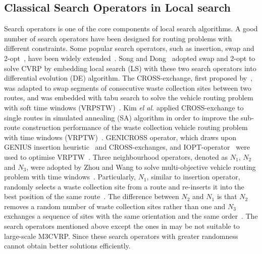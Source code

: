 \documentclass[journal]{IEEEtran}
\newcommand\yzy[1]{\textcolor{blue}{#1}}
\newcommand\lwx[1]{\textcolor{magenta}{#1}}
\begin{document}
\subsection{Classical Search Operators in Local search}\label{move_operator}

Search operators is one of the core components of local search algorithms. A good number of search operators have been designed for routing problems with different constraints.
Some popular search operators, such as insertion, swap and 2-opt~\cite{lin1965computer}, have been widely extended~\cite{handa2006robust,handa2006robust2,hertz2000a,hertz2001a,BeullensA,brandao2008a}. Song and Dong~\cite{song2018an} adopted swap and 2-opt to solve CVRP by embedding local search (LS) with these two search operators into differential evolution (DE) algorithm. The CROSS-exchange, first proposed by~\cite{golden1980approximate}, was adapted to swap segments of consecutive waste collection sites between two routes, and was embedded with tabu search to solve the vehicle routing problem with soft time windows (VRPSTW)~\cite{taillard1997a}. Kim \emph{el al.} applied CROSS-exchange to single routes in simulated annealing (SA) algorithm 
in order to improve the sub-route construction performance of the waste collection vehicle routing problem with time windows (VRPTW)~\cite{kim2006waste}. 
GENICROSS operator, which draws upon GENIUS insertion heuristic~\cite{gendreau1992new} and CROSS-exchanges, and IOPT-operator~\cite{braysy2004a} were used to optimise VRPTW~\cite{braysy2004a}. Three neighbourhood operators, denoted as $N_1$, $N_2$ and $N_3$, were adopted by Zhou and Wang to solve multi-objective vehicle routing problem with time windows~\cite{zhou2015a}. Particularly, $N_1$, similar to insertion operator, randomly selects a waste collection site from a route and re-inserts it into the best position of the same route~\cite{zhou2015a}. The difference between $N_2$ and $N_1$ is that $N_2$ removes a random number of waste collection sites rather than one and $N_3$ exchanges a sequence of sites with the same orientation and the same order~\cite{zhou2015a}. 
The search operators mentioned above except the ones in \cite{zhou2015a} may be not suitable to large-scale M3CVRP. Since these search operators with greater randomness cannot obtain better solutions efficiently. 
\end{document}
